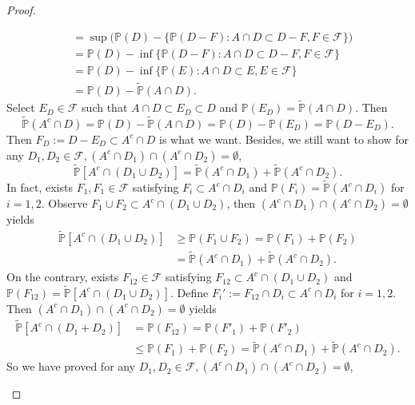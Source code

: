 \documentclass[12pt]{article}
\renewcommand{\(}{\left(}%
\renewcommand{\)}{\right)}%
\renewcommand{\[}{\left[}%
\renewcommand{\]}{\right]}%
\newcommand{\p}{\mathbb{P}}
\newcommand{\f}{\mathscr{F}}
\newtheorem{proof}{Proof.}}
\begin{document}
\begin{proof}
\begin{enumerate}
\begin{equation*}
\begin{split}
   	 		&=\sup\big(\p(D)- \{\p(D-F):A\cap D\subset D-F,F\in\f\}\big)\\
   	 		&=\p(D)-\inf \{\p(D-F):A\cap D\subset D-F,F\in\f\}\\
   	 		&=\p(D)-\inf \{\p(E):A\cap D\subset E,E\in\f\}\\
   	 		&=\p(D)-\widetilde{\p}(A\cap D).
   	 	\end{split}
   	 \end{equation*}
   	 Select $E_D\in\f$ such that $A\cap D\subset E_D\subset D$ and $\p(E_D)=\widetilde{\p}(A\cap D)$. Then 
   	 \begin{equation*}
   	 	\widetilde{\p}(A^c\cap D)=\p(D)-\widetilde{\p}(A\cap D)=\p(D)-\p(E_D)=\p(D-E_D).
   	 \end{equation*}
   	 Then $F_D:=D-E_D\subset A^c\cap D$ is what we want. Besides, we still want to show for any $D_1,D_2\in\f,(A^c\cap D_1)\cap (A^c\cap D_2)=\emptyset$,
   	 \begin{equation*}
   	 	\widetilde{\p}[A^c\cap (D_1\cup D_2)]=\widetilde{\p}(A^c\cap D_1)+\widetilde{\p}(A^c\cap D_2).
   	 \end{equation*} 
   	 In fact, exists $F_1,F_1\in\f$ satisfying $F_i\subset A^c\cap D_i$ and $\p(F_i)=\widetilde{\p}(A^c\cap D_i)$ for $i=1,2$. Observe $F_1\cup F_2\subset A^c\cap (D_1\cup D_2)$, then $(A^c\cap D_1)\cap (A^c\cap D_2)=\emptyset$ yields 
   	 \begin{equation*}
   	 	\begin{split}
   	 		\widetilde{\p}[A^c\cap (D_1\cup D_2)]&\geq \p(F_1\cup F_2)=\p(F_1)+\p(F_2)\\
   	 		&=\widetilde{\p}(A^c\cap D_1)+\widetilde{\p}(A^c\cap D_2).
   	 	\end{split}
   	 \end{equation*}
   	 On the contrary, exists $F_{12}\in\f$ satisfying $F_{12}\subset A^c\cap (D_1\cup D_2)$ and $\p(F_{12})=\widetilde{\p}[A^c\cap (D_1\cup D_2)]$. Define $F_{{i}}':=F_{12}\cap D_i\subset A^c\cap D_i$ for $i=1,2$. Then $(A^c\cap D_1)\cap (A^c\cap D_2)=\emptyset$ yields
   	 \begin{equation*}
   	 	\begin{split}
   	 		\widetilde{\p}[A^c\cap (D_1+D_2)]&=\p(F_{12})=\p(F'_{1})+\p(F'_{2})\\
   	 		&\leq \p(F_1)+\p(F_2)=\widetilde{\p}(A^c\cap D_1)+\widetilde{\p}(A^c\cap D_2).
   	 	\end{split}
   	 \end{equation*}
   	 So we have proved for any $D_1,D_2\in\f,(A^c\cap D_1)\cap (A^c\cap D_2)=\emptyset$,

\end{enumerate}
\end{proof}
\end{document}
